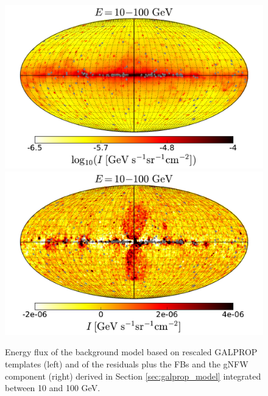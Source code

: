 \begin{figure}[h]
\centering
\includegraphics[width=\twopic\textwidth]{plots/Mollwiede_GALPROP_model_source_range2_log.pdf}
 \includegraphics[width=\twopic\textwidth]{plots/Mollwiede_GALPROP_source_range2.pdf}
 \caption{Energy flux of the background model based on rescaled GALPROP templates (left)
 and of the residuals plus the FBs and the gNFW component (right) derived in Section \ref{sec:galprop_model}
 integrated between 10 and 100 GeV.}
 \label{fig:Maps_GALPROP}
\end{figure}

